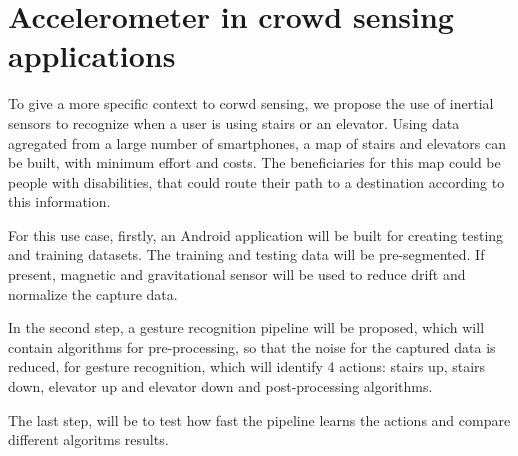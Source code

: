 \section{Accelerometer in crowd sensing applications}
\label{sec:intro-acc-crowd}

To give a more specific context to corwd sensing, we propose the use of inertial sensors to recognize when a user is using stairs or an elevator. Using data agregated from a large number of smartphones, a map of stairs and elevators can be built, with minimum effort and costs. The beneficiaries for this map could be people with disabilities, that could route their path to a destination according to this information.

For this use case, firstly, an Android application will be built for creating testing and training datasets. The training and testing data will be pre-segmented. If present, magnetic and gravitational sensor will be used to reduce drift and normalize the capture data.

In the second step, a gesture recognition pipeline will be proposed, which will contain algorithms for pre-processing, so that the noise for the captured data is reduced, for gesture recognition, which will identify 4 actions: stairs up, stairs down, elevator up and elevator down and post-processing algorithms.

The last step, will be to test how fast the pipeline learns the actions and compare different algoritms results.
